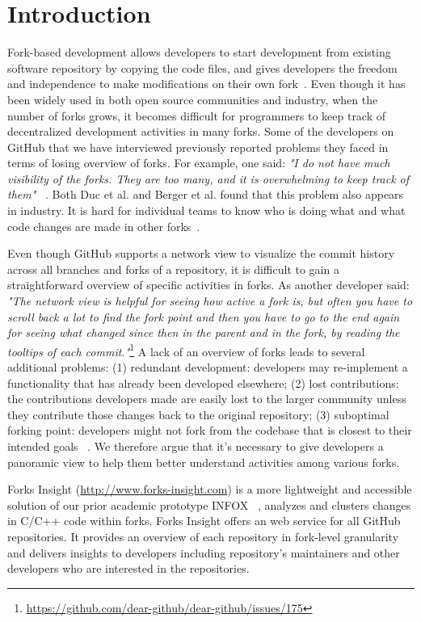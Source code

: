 \section{Introduction}
Fork-based development allows developers to start development from existing software repository by copying the code files, and gives developers the freedom and independence to make modifications on their own fork~\cite{dubinsky2013exploratory, bitzer2006impact, ernst2010code,vetter2007open}. Even though it has been widely used in both open source communities and industry, when the number of forks grows, it becomes difficult for programmers to keep track of decentralized development activities in many forks. Some of the developers on GitHub that we have interviewed previously reported problems they faced in terms of losing overview of forks. For example, one said: \emph{"I do not have much visibility of the forks. They are too many, and it is overwhelming to keep track of them"} ~\cite{ZSLXWK:ICSE18}. Both Duc et al. and Berger et al. found that this problem also appears in industry. It is hard for individual teams to know who is doing what and what code changes are made in other forks~\cite{berger2014three,Duc:2014:FCM:2652524.2652546}.

Even though GitHub supports a network view to visualize the commit history across all branches and forks of a repository, it is difficult to gain a straightforward overview of specific activities in forks. As another developer said: \emph{"The network view is helpful for seeing how active a fork is, but often you have to scroll back a lot to find the fork point and then you have to go to the end again for seeing what changed since then in the parent and in the fork, by reading the tooltips of each commit."}\footnote{\url{https://github.com/dear-github/dear-github/issues/175}}
 A lack of an overview of forks leads to several additional problems: (1) redundant development: developers may re-implement a functionality that has already been developed elsewhere; (2) lost contributions: the contributions developers made are easily lost to the larger community unless they contribute those changes back to the original repository; (3) suboptimal forking point: developers might not fork from the codebase that is closest to their intended goals ~\cite{ZSLXWK:ICSE18, dubinsky2013exploratory,stanciulescu2015forked}. We therefore argue that it's necessary to give developers a panoramic view to help them better understand activities among various forks.

Forks Insight (\url{http://www.forks-insight.com}) is a more lightweight and accessible solution of our prior academic prototype INFOX ~\cite{ZSLXWK:ICSE18}, analyzes and clusters changes in C/C++ code within forks. Forks Insight offers an web service for all GitHub repositories. It provides an overview of each repository in fork-level granularity and delivers insights to developers including repository's maintainers and other developers who are interested in the repositories.

